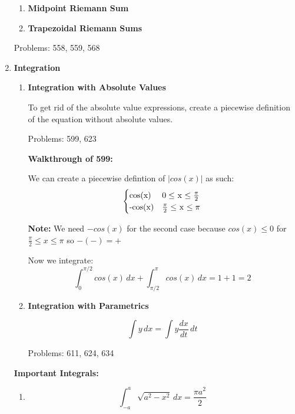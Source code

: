 \documentclass[11pt,twoside]{article}
\begin{document}
\begin{enumerate}
\begin{enumerate}
    \item \textbf{Midpoint Riemann Sum} 
    \item \textbf{Trapezoidal Riemann Sums}
  \end{enumerate}

Problems: 558, 559, 568
  
\item \textbf{Integration}

\begin{enumerate}
    \item \textbf{Integration with Absolute Values}
    
    To get rid of the absolute value expressions, create a piecewise definition of the equation without absolute values. 
    
    Problems: 599, 623
    
    \textbf{Walkthrough of 599:}
    
    We can create a piecewise defintion of $|cos(x)|$ as such:
    \[ \begin{cases} 
    $cos(x)$ &  0 \leq $ x $ \leq \frac{\pi}{2} \\
    $-cos(x)$ &  \frac{\pi}{2} \leq $ x $ \leq \pi 
    \end{cases}
    \]
    
    \textbf{Note:} We need $-cos(x)$ for the second case because $cos(x) \leq 0$ for $\frac{\pi}{2} \leq x \leq \pi $ so $-(-) = +$
    
    Now we integrate:
    \begin{equation*}
    \int_{0}^{\pi/2} cos(x) \,dx +  \int_{\pi/2}^{\pi} cos(x) \,dx = 1 + 1 = 2
    \end{equation*}
    
    \item \textbf{Integration with Parametrics}
    
    \begin{equation*}
    \int y \,dx = \int y \frac{dx}{dt} \,dt
    \end{equation*}
    
    Problems: 611, 624, 634
    

    
\end{enumerate}

\textbf{Important Integrals:}
\begin{enumerate}
    \item \begin{equation*}
    \int_{-a}^{a} \sqrt{a^2-x^2} \,dx = \frac{\pi a^2}{2}
    \end{equation*}
    

\end{enumerate}
\end{enumerate}
\end{document}

